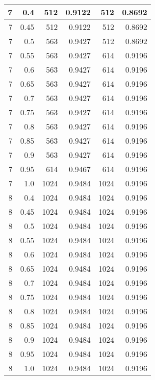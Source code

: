 \begin{center}
\begin{longtable}{|r|r|r|r|r|r|}
\hline
7 & 0.4 & 512 & 0.9122 & 512 & 0.8692 \\
\hline
7 & 0.45 & 512 & 0.9122 & 512 & 0.8692 \\
\hline
7 & 0.5 & 563 & 0.9427 & 512 & 0.8692 \\
\hline
7 & 0.55 & 563 & 0.9427 & 614 & 0.9196 \\
\hline
7 & 0.6 & 563 & 0.9427 & 614 & 0.9196 \\
\hline
7 & 0.65 & 563 & 0.9427 & 614 & 0.9196 \\
\hline
7 & 0.7 & 563 & 0.9427 & 614 & 0.9196 \\
\hline
7 & 0.75 & 563 & 0.9427 & 614 & 0.9196 \\
\hline
7 & 0.8 & 563 & 0.9427 & 614 & 0.9196 \\
\hline
7 & 0.85 & 563 & 0.9427 & 614 & 0.9196 \\
\hline
7 & 0.9 & 563 & 0.9427 & 614 & 0.9196 \\
\hline
7 & 0.95 & 614 & 0.9467 & 614 & 0.9196 \\
\hline
7 & 1.0 & 1024 & 0.9484 & 1024 & 0.9196 \\
\hline
8 & 0.4 & 1024 & 0.9484 & 1024 & 0.9196 \\
\hline
8 & 0.45 & 1024 & 0.9484 & 1024 & 0.9196 \\
\hline
8 & 0.5 & 1024 & 0.9484 & 1024 & 0.9196 \\
\hline
8 & 0.55 & 1024 & 0.9484 & 1024 & 0.9196 \\
\hline
8 & 0.6 & 1024 & 0.9484 & 1024 & 0.9196 \\
\hline
8 & 0.65 & 1024 & 0.9484 & 1024 & 0.9196 \\
\hline
8 & 0.7 & 1024 & 0.9484 & 1024 & 0.9196 \\
\hline
8 & 0.75 & 1024 & 0.9484 & 1024 & 0.9196 \\
\hline
8 & 0.8 & 1024 & 0.9484 & 1024 & 0.9196 \\
\hline
8 & 0.85 & 1024 & 0.9484 & 1024 & 0.9196 \\
\hline
8 & 0.9 & 1024 & 0.9484 & 1024 & 0.9196 \\
\hline
8 & 0.95 & 1024 & 0.9484 & 1024 & 0.9196 \\
\hline
8 & 1.0 & 1024 & 0.9484 & 1024 & 0.9196 \\
\hline

\end{longtable}
\end{center}
